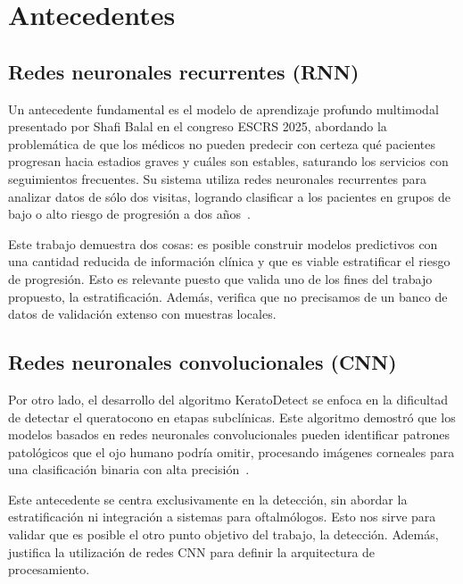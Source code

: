 \par\vspace{-0.2 cm}
\section{Antecedentes}

    \par\vspace{-0.25 cm}
    \subsection*{Redes neuronales recurrentes (RNN)}

        Un antecedente fundamental es el modelo de aprendizaje profundo multimodal presentado por Shafi Balal en el congreso ESCRS 2025, abordando la problemática de que los médicos no pueden predecir con certeza qué pacientes progresan hacia estadios graves y cuáles son estables, saturando los servicios con seguimientos frecuentes. Su sistema utiliza redes neuronales recurrentes para analizar datos de sólo dos visitas, logrando clasificar a los pacientes en grupos de bajo o alto riesgo de progresión a dos años~.

        Este trabajo demuestra dos cosas: es posible construir modelos predictivos con una cantidad reducida de información clínica y que es viable estratificar el riesgo de progresión. Esto es relevante puesto que valida uno de los fines del trabajo propuesto, la estratificación. Además, verifica que no precisamos de un banco de datos de validación extenso con muestras locales.

    \par\vspace{-0.1 cm}
    \subsection*{Redes neuronales convolucionales (CNN)}
    
        Por otro lado, el desarrollo del algoritmo KeratoDetect se enfoca en la dificultad de detectar el queratocono en etapas subclínicas. Este algoritmo demostró que los modelos basados en redes neuronales convolucionales pueden identificar patrones patológicos que el ojo humano podría omitir, procesando imágenes corneales para una clasificación binaria con alta precisión~.

        Este antecedente se centra exclusivamente en la detección, sin abordar la estratificación ni integración a sistemas para oftalmólogos. Esto nos sirve para validar que es posible el otro punto objetivo del trabajo, la detección. Además, justifica la utilización de redes CNN para definir la arquitectura de procesamiento.

